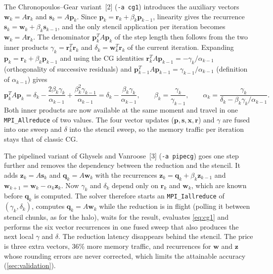 \documentclass[10pt,a4paper]{article}
\newcommand{\code}[1]{\texttt{#1}}
\newcommand{\vb}[1]{\mathbf{#1}}
\begin{document}
The Chronopoulos--Gear variant~[2] (\code{-a cg1}) introduces the auxiliary vectors $\vb w_k=A\vb r_k$ and
$\vb s_k=A\vb p_k$. Since $\vb p_k=\vb r_k+\beta_k\vb p_{k-1}$, linearity gives the recurrence
$\vb s_k=\vb w_k+\beta_k\vb s_{k-1}$, and the only stencil application per iteration becomes $\vb w_k=A\vb
r_k$. The denominator $\vb p_k^TA\vb p_k$ of the step length then follows from the two inner products
$\gamma_k=\vb r_k^T\vb r_k$ and $\delta_k=\vb w_k^T\vb r_k$ of the current iteration. Expanding
$\vb p_k=\vb r_k+\beta_k\vb p_{k-1}$ and using the CG identities $\vb r_k^TA\vb p_{k-1}=-\gamma_k/\alpha_{k-1}$
(orthogonality of successive residuals) and $\vb p_{k-1}^TA\vb p_{k-1}=\gamma_{k-1}/\alpha_{k-1}$ (definition
of $\alpha_{k-1}$) gives
\begin{equation}\label{eq:cg1}
  \vb p_k^TA\vb p_k=\delta_k-\frac{2\beta_k\gamma_k}{\alpha_{k-1}}+\frac{\beta_k^2\gamma_{k-1}}{\alpha_{k-1}}
  =\delta_k-\frac{\beta_k\gamma_k}{\alpha_{k-1}},\qquad
  \beta_k=\frac{\gamma_k}{\gamma_{k-1}},\qquad
  \alpha_k=\frac{\gamma_k}{\delta_k-\beta_k\gamma_k/\alpha_{k-1}} .
\end{equation}
Both inner products are now available at the same moment and travel in one \code{MPI\_Allreduce} of two
values. The four vector updates ($\vb p,\vb s,\vb x,\vb r$) and $\gamma$ are fused into one sweep and
$\delta$ into the stencil sweep, so the memory traffic per iteration stays that of classic CG.

The pipelined variant of Ghysels and Vanroose~[3] (\code{-a pipecg}) goes one step further and removes the
dependency between the reduction and the stencil. It adds $\vb z_k=A\vb s_k$ and $\vb q_k=A\vb w_k$ with
the recurrences $\vb z_k=\vb q_k+\beta_k\vb z_{k-1}$ and $\vb w_{k+1}=\vb w_k-\alpha_k\vb z_k$. Now
$\gamma_k$ and $\delta_k$ depend only on $\vb r_k$ and $\vb w_k$, which are known before $\vb q_k$ is
computed. The solver therefore starts an \code{MPI\_Iallreduce} of $(\gamma_k,\delta_k)$, computes $\vb
q_k=A\vb w_k$ while the reduction is in flight (polling it between stencil chunks, as for the halo), waits
for the result, evaluates \eqref{eq:cg1} and performs the six vector recurrences in one fused sweep that
also produces the next local $\gamma$ and $\delta$. The reduction latency disappears behind the stencil.
The price is three extra vectors, 36\% more memory traffic, and recurrences for $\vb w$ and $\vb z$ whose
rounding errors are never corrected, which limits the attainable accuracy (\cref{sec:validation}).
\end{document}
